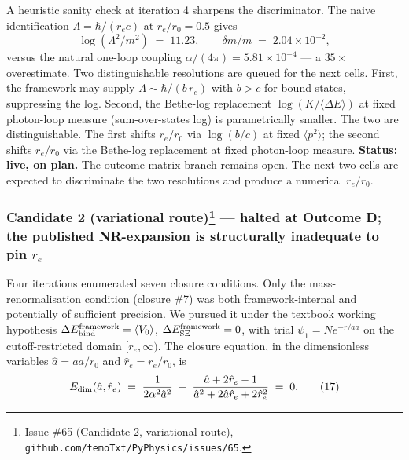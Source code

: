 \documentclass[
  11pt,
]{article}
\begin{document}
A heuristic sanity check at iteration 4 sharpens the discriminator. The
naive identification \(\Lambda = \hbar/(r_e c)\) at \(r_e/r_0 = 0.5\)
gives \[
\log(\Lambda^2/m^2) \;=\; 11.23, \qquad \delta m/m \;=\; 2.04 \times 10^{-2}, \tag{16}
\] versus the natural one-loop coupling
\(\alpha/(4\pi) = 5.81 \times 10^{-4}\) --- a \(35\times\) overestimate.
Two distinguishable resolutions are queued for the next cells. First,
the framework may supply \(\Lambda \sim \hbar/(b\,r_e)\) with \(b > c\)
for bound states, suppressing the log. Second, the Bethe-log replacement
\(\log(K/\langle\Delta E\rangle)\) at fixed photon-loop measure
(sum-over-states log) is parametrically smaller. The two are
distinguishable. The first shifts \(r_e/r_0\) via \(\log(b/c)\) at fixed
\(\langle p^2\rangle\); the second shifts \(r_e/r_0\) via the Bethe-log
replacement at fixed photon-loop measure. \textbf{Status: live, on
plan.} The outcome-matrix branch remains open. The next two cells are
expected to discriminate the two resolutions and produce a numerical
\(r_e/r_0\).

\hypertarget{candidate-2-variational-route4-halted-at-outcome-d-the-published-nr-expansion-is-structurally-inadequate-to-pin-r_e}{%
\subsubsection[Candidate 2 (variational route) --- halted at Outcome D;
the published NR-expansion is structurally inadequate to pin
\(r_e\)]{\texorpdfstring{Candidate 2 (variational route)\footnote{Issue
  \#65 (Candidate 2, variational route),
  \texttt{github.com/temoTxt/PyPhysics/issues/65}.} --- halted at
Outcome D; the published NR-expansion is structurally inadequate to pin
\(r_e\)}{Candidate 2 (variational route) --- halted at Outcome D; the published NR-expansion is structurally inadequate to pin r\_e}}\label{candidate-2-variational-route4-halted-at-outcome-d-the-published-nr-expansion-is-structurally-inadequate-to-pin-r_e}}

Four iterations enumerated seven closure conditions. Only the
mass-renormalisation condition (closure \#7) was both framework-internal
and potentially of sufficient precision. We pursued it under the
textbook working hypothesis
\(\Delta E_{\rm bind}^{\rm framework} = \langle V_0\rangle\),
\(\Delta E_{\rm SE}^{\rm framework} = 0\), with trial
\(\psi_1 = N e^{-r/aa}\) on the cutoff-restricted domain
\([r_e, \infty)\). The closure equation, in the dimensionless variables
\(\hat{a} = aa/r_0\) and \(\hat{r}_e = r_e/r_0\), is \[
E_{\rm dim}(\hat{a}, \hat{r}_e) \;=\; \frac{1}{2\alpha^2 \hat{a}^2} \;-\; \frac{\hat{a} + 2\hat{r}_e - 1}{\hat{a}^2 + 2\hat{a}\hat{r}_e + 2\hat{r}_e^2} \;=\; 0. \tag{17}
\]
\end{document}
